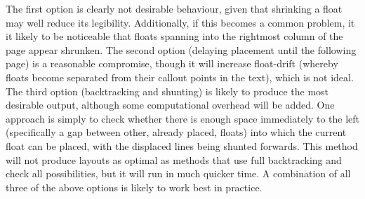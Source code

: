 The first option is clearly not desirable behaviour, given that shrinking a float may well reduce its legibility. Additionally, if this becomes a common problem, it it likely to be noticeable that floats spanning into the rightmost column of the page appear shrunken. The second option (delaying placement until the following page) is a reasonable compromise, though it will increase float-drift (whereby floats become separated from their callout points in the text), which is not ideal. The third option (backtracking and shunting) is likely to produce the most desirable output, although some computational overhead will be added. One approach is simply to check whether there is enough space immediately to the left (specifically a gap between other, already placed, floats) into which the current float can be placed, with the displaced lines being shunted forwards. This method will not produce layouts as optimal as methods that use full backtracking and check all possibilities, but it will run in much quicker time. A combination of all three of the above options is likely to work best in practice.


